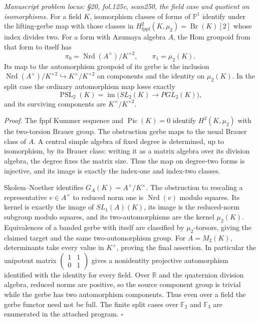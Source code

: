 \emph{Manuscript problem locus: \S20, fol.125v, scan250, the field case and quotient on isomorphisms.}
For a field $K$, isomorphism classes of forms of $\mathbb P^1$ identify under the lifting-gerbe map with those classes in $H^2_{\mathrm{fppf}}(K,\mu_2)=\operatorname{Br}(K)[2]$ whose index divides two. For a form with Azumaya algebra $A$, the Hom groupoid from that form to itself has
\[
\pi_0=\operatorname{Nrd}(A^\times)/K^{\times2},
\qquad \pi_1=\mu_2(K).
\]
Its map to the automorphism groupoid of its gerbe is the inclusion
$\operatorname{Nrd}(A^\times)/K^{\times2}\hookrightarrow K^\times/K^{\times2}$ on components and the identity on $\mu_2(K)$. In the split case the ordinary automorphism map loses exactly
\[
\operatorname{PSL}_2(K)
 =\operatorname{im}\bigl(SL_2(K)\to PGL_2(K)\bigr),
\]
and its surviving components are $K^\times/K^{\times2}$.

\emph{Proof.} The fppf Kummer sequence and $\operatorname{Pic}(K)=0$ identify $H^2(K,\mu_2)$ with the two-torsion Brauer group. The obstruction gerbe maps to the usual Brauer class of $A$. A central simple algebra of fixed degree is determined, up to isomorphism, by its Brauer class: writing it as a matrix algebra over its division algebra, the degree fixes the matrix size. Thus the map on degree-two forms is injective, and its image is exactly the index-one and index-two classes.

Skolem--Noether identifies $G_A(K)=A^\times/K^\times$. The obstruction to rescaling a representative $v\in A^\times$ to reduced norm one is $\operatorname{Nrd}(v)$ modulo squares. Its kernel is exactly the image of $SL_1(A)(K)$, its image is the reduced-norm subgroup modulo squares, and its two-automorphisms are the kernel $\mu_2(K)$. Equivalences of a banded gerbe with itself are classified by $\mu_2$-torsors, giving the claimed target and the same two-automorphism group. For $A=M_2(K)$, determinants take every value in $K^\times$, proving the final assertion. In particular the unipotent matrix $\left(\begin{smallmatrix}1&1\\0&1\end{smallmatrix}\right)$ gives a nonidentity projective automorphism identified with the identity for every field. Over $\mathbb R$ and the quaternion division algebra, reduced norms are positive, so the source component group is trivial while the gerbe has two automorphism components. Thus even over a field the gerbe functor need not be full. The finite split cases over $\mathbb F_2$ and $\mathbb F_3$ are enumerated in the attached program. \hfill$\square$

